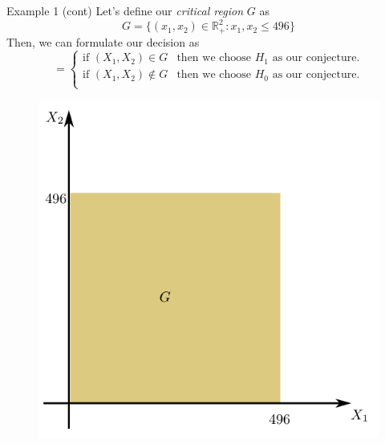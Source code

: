 \documentclass{beamer}
\begin{document}
\begin{frame}{Example 1 (cont)}
	Let's define our \textit{critical region} $G$ as 
	\begin{equation*}
		G=\{(x_1,x_2)\in \mathbb{R}^2_+: x_1,x_2 \le 496\}
	\end{equation*}
	Then, we can formulate our decision as
	\begin{equation*}
		=
		\begin{cases}
			\text{if }(X_1,X_2) \in G & \text{then we choose $H_1$ as our conjecture}.\\
			\text{if }(X_1,X_2) \notin G & \text{then we choose $H_0$ as our conjecture}.\\
		\end{cases}	
		\end{equation*}
	\begin{figure}[h]
	\centering
	\includegraphics[scale=0.35]{../../Figures/fig_hypo_test_region.png}
\end{figure}		
	
	
\end{frame}
\end{document}
